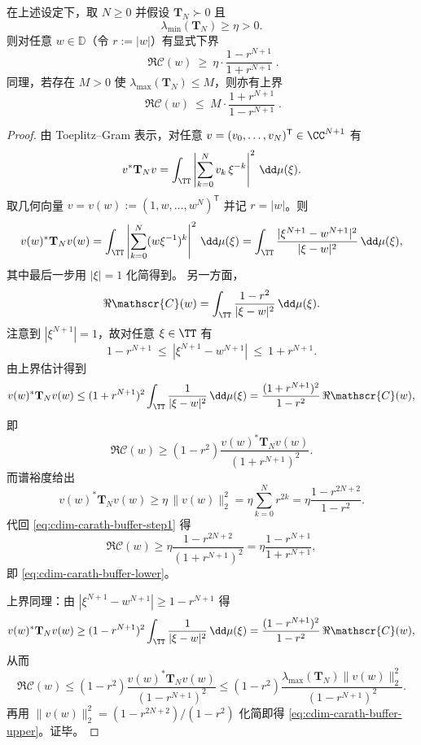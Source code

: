 \begin{theorem}\label{thm:cdim-toeplitz-spectral-gap-carath-buffer}
在上述设定下，取 \(N\ge 0\) 并假设 \(\mathbf{T}_N\succ 0\) 且
\[
\lambda_{\min}(\mathbf{T}_N)\ge \eta>0.
\]
则对任意 \(w\in\mathbb{D}\)（令 \(r:=|w|\)）有显式下界
\begin{equation}\label{eq:cdim-carath-buffer-lower}
\boxed{\;
\Re \mathscr{C}(w)\ \ge\ \eta\cdot\frac{1-r^{N+1}}{1+r^{N+1}}\; }.
\end{equation}
同理，若存在 \(M>0\) 使 \(\lambda_{\max}(\mathbf{T}_N)\le M\)，则亦有上界
\begin{equation}\label{eq:cdim-carath-buffer-upper}
\boxed{\;
\Re \mathscr{C}(w)\ \le\ M\cdot\frac{1+r^{N+1}}{1-r^{N+1}}\; }.
\end{equation}
\end{theorem}
\begin{proof}
由 Toeplitz--Gram 表示，对任意 \(v=(v_0,\dots,v_N)^{\mathsf T}\in\CC^{N+1}\) 有
\[
v^\ast\mathbf{T}_N v=\int_{\TT}\left|\sum_{k=0}^N v_k\,\xi^{-k}\right|^2\,\dd\mu(\xi).
\]
取几何向量 \(v=v(w):=(1,w,\dots,w^N)^{\mathsf T}\) 并记 \(r=|w|\)。则
\[
v(w)^\ast\mathbf{T}_N v(w)
=\int_{\TT}\left|\sum_{k=0}^N (w\xi^{-1})^k\right|^2\,\dd\mu(\xi)
=\int_{\TT}\frac{|\xi^{N+1}-w^{N+1}|^2}{|\xi-w|^2}\,\dd\mu(\xi),
\]
其中最后一步用 \(|\xi|=1\) 化简得到。
另一方面，
\[
\Re \mathscr{C}(w)=\int_{\TT}\frac{1-r^2}{|\xi-w|^2}\,\dd\mu(\xi).
\]
注意到 \(|\xi^{N+1}|=1\)，故对任意 \(\xi\in\TT\) 有
\[
1-r^{N+1}\ \le\ |\xi^{N+1}-w^{N+1}|\ \le\ 1+r^{N+1}.
\]
由上界估计得到
\[
v(w)^\ast\mathbf{T}_N v(w)
\le (1+r^{N+1})^2\int_{\TT}\frac{1}{|\xi-w|^2}\,\dd\mu(\xi)
=\frac{(1+r^{N+1})^2}{1-r^2}\,\Re \mathscr{C}(w),
\]
即
\begin{equation}\label{eq:cdim-carath-buffer-step1}
\Re \mathscr{C}(w)\ge (1-r^2)\frac{v(w)^\ast\mathbf{T}_N v(w)}{(1+r^{N+1})^2}.
\end{equation}
而谱裕度给出
\[
v(w)^\ast\mathbf{T}_N v(w)\ge \eta\,\|v(w)\|_2^2
=\eta\sum_{k=0}^N r^{2k}
=\eta\frac{1-r^{2N+2}}{1-r^2}.
\]
代回 \eqref{eq:cdim-carath-buffer-step1} 得
\[
\Re \mathscr{C}(w)
\ge
\eta\frac{1-r^{2N+2}}{(1+r^{N+1})^2}
=\eta\frac{1-r^{N+1}}{1+r^{N+1}},
\]
即 \eqref{eq:cdim-carath-buffer-lower}。
\par
上界同理：由 \(|\xi^{N+1}-w^{N+1}|\ge 1-r^{N+1}\) 得
\[
v(w)^\ast\mathbf{T}_N v(w)\ge (1-r^{N+1})^2\int_{\TT}\frac{1}{|\xi-w|^2}\,\dd\mu(\xi)
=\frac{(1-r^{N+1})^2}{1-r^2}\,\Re\mathscr{C}(w),
\]
从而
\[
\Re\mathscr{C}(w)\le (1-r^2)\frac{v(w)^\ast\mathbf{T}_N v(w)}{(1-r^{N+1})^2}
\le (1-r^2)\frac{\lambda_{\max}(\mathbf{T}_N)\|v(w)\|_2^2}{(1-r^{N+1})^2}.
\]
再用 \(\|v(w)\|_2^2=(1-r^{2N+2})/(1-r^2)\) 化简即得 \eqref{eq:cdim-carath-buffer-upper}。证毕。
\end{proof}

